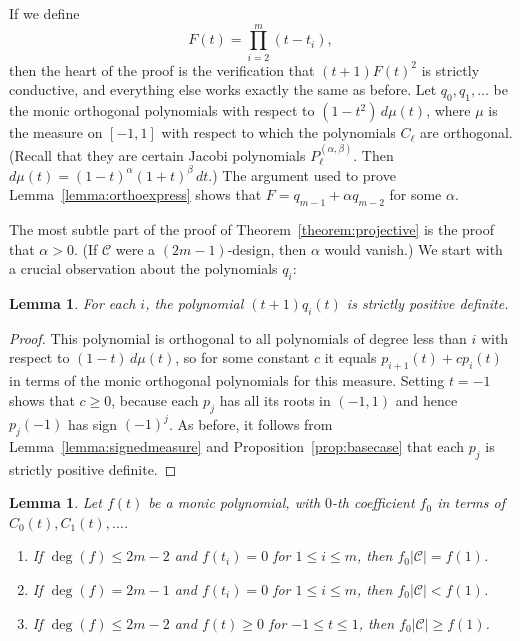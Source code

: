 \documentclass{jams-l}
\theoremstyle{plain}
\newtheorem{lemma}[theorem]{Lemma}
\numberwithin{theorem}{section}
\theoremstyle{definition}
\numberwithin{equation}{section}
\newcommand{\CodeS}{\mathcal{C}}
\begin{document}
If we define
$$
F(t) = \prod_{i=2}^m (t-t_i),
$$
then the heart of the proof is the verification that $(t+1)F(t)^2$
is strictly conductive, and everything else works exactly the same
as before.  Let $q_0,q_1,\dots$ be the monic orthogonal
polynomials with respect to $(1-t^2)\,d\mu(t)$, where $\mu$ is the
measure on $[-1,1]$ with respect to which the polynomials $C_\ell$
are orthogonal.  (Recall that they are certain Jacobi polynomials
$P^{(\alpha,\beta)}_\ell$.  Then $d\mu(t) =
(1-t)^\alpha(1+t)^\beta \, dt$.)  The argument used to prove
Lemma~\ref{lemma:orthoexpress} shows that $F = q_{m-1} + \alpha
q_{m-2}$ for some $\alpha$.

The most subtle part of the proof of
Theorem~\ref{theorem:projective} is the proof that $\alpha > 0$.
(If $\CodeS$ were a $(2m-1)$-design, then $\alpha$ would vanish.)
We start with a crucial observation about the polynomials $q_i$:

\begin{lemma} \label{lemma:qposdef}
For each $i$, the polynomial $(t+1)q_i(t)$ is strictly positive
definite.
\end{lemma}

\begin{proof}
This polynomial is orthogonal to all polynomials of degree less
than $i$ with respect to $(1-t) \, d\mu(t)$, so for some constant
$c$ it equals $p_{i+1}(t) + c p_i(t)$ in terms of the monic
orthogonal polynomials for this measure.  Setting $t=-1$ shows
that $c \ge 0$, because each $p_j$ has all its roots in $(-1,1)$
and hence $p_j(-1)$ has sign $(-1)^j$. As before, it follows from
Lemma~\ref{lemma:signedmeasure} and
Proposition~\ref{prop:basecase} that each $p_j$ is strictly
positive definite.
\end{proof}

\begin{lemma} \label{lemma:ineqs}
Let $f(t)$ be a monic polynomial, with $0$-th coefficient $f_0$ in
terms of $C_0(t),C_1(t),\dots$.
\begin{enumerate}
\item If $\deg(f) \le 2m-2$ and $f(t_i)=0$ for $1 \le i \le m$,
then $f_0|\CodeS| = f(1)$. \item If $\deg(f) = 2m-1$ and
$f(t_i)=0$ for $1 \le i \le m$, then $f_0|\CodeS| < f(1)$.\item If
$\deg(f) \le 2m-2$ and $f(t) \ge 0$ for $-1 \le t \le 1$, then
$f_0|\CodeS| \ge f(1)$.
\end{enumerate}
\end{lemma}
\end{document}
